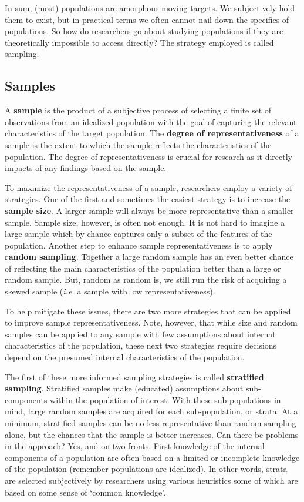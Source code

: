 \documentclass[
  letterpaper,
  DIV=11,
  numbers=noendperiod]{scrreport}
\theoremstyle{definition}
\theoremstyle{remark}
\begin{document}
In sum, (most) populations are amorphous moving targets. We subjectively
hold them to exist, but in practical terms we often cannot nail down the
specifics of populations. So how do researchers go about studying
populations if they are theoretically impossible to access directly? The
strategy employed is called sampling.

\hypertarget{sec-ud-samples}{%
\subsection{Samples}\label{sec-ud-samples}}

A \textbf{sample} is the product of a subjective process
of selecting a finite set of observations from an idealized population
with the goal of capturing the relevant characteristics of the target
population. The \textbf{degree of representativeness}
 of a sample is the extent to which the
sample reflects the characteristics of the population. The degree of
representativeness is crucial for research as it directly impacts of any
findings based on the sample.

To maximize the representativeness of a sample, researchers employ a
variety of strategies. One of the first and sometimes the easiest
strategy is to increase the \textbf{sample size}. A
larger sample will always be more representative than a smaller sample.
Sample size, however, is often not enough. It is not hard to imagine a
large sample which by chance captures only a subset of the features of
the population. Another step to enhance sample representativeness is to
apply \textbf{random sampling}. Together a large random sample has an
even better chance of reflecting the main characteristics of the
population better than a large or random sample. But, random as random
is, we still run the risk of acquiring a skewed sample (\emph{i.e.} a
sample with low representativeness).

To help mitigate these issues, there are two more strategies that can be
applied to improve sample representativeness. Note, however, that while
size and random samples can be applied to any sample with few
assumptions about internal characteristics of the population, these next
two strategies require decisions depend on the presumed internal
characteristics of the population.

The first of these more informed sampling strategies is called
\textbf{stratified sampling}. Stratified samples make (educated)
assumptions about sub-components within the population of interest. With
these sub-populations in mind, large random samples are acquired for
each sub-population, or strata. At a minimum, stratified samples can be
no less representative than random sampling alone, but the chances that
the sample is better increases. Can there be problems in the approach?
Yes, and on two fronts. First knowledge of the internal components of a
population are often based on a limited or incomplete knowledge of the
population (remember populations are idealized). In other words, strata
are selected subjectively by researchers using various heuristics some
of which are based on some sense of `common knowledge'.
\end{document}
